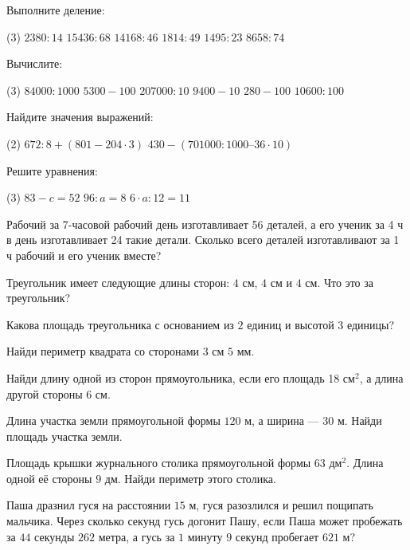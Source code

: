 \begin{class}[number=5]
	\begin{listofex}
		\item Выполните деление:
		\begin{tasks}(3)
			\task \( 2380 : 14 \)
			\task \( 15436 : 68 \)
			\task \( 14168 : 46 \)
			\task \( 1814 : 49 \)
			\task \( 1495 : 23 \)
			\task \( 8658 : 74 \)
		\end{tasks} 
		\item Вычислите: \begin{tasks}(3)
			\task \( 84 000 : 1000  \)
			\task \( 5300 - 100   \)
			\task \(	207 000 : 10   \)
			\task \(	9400 - 10   \)
			\task \(	280- 100  \)
			\task \(	10 600 : 100 \)
		\end{tasks}
		\item Найдите значения выражений: \begin{tasks}(2)
			\task \( 672 : 8 + (801 - 204 \cdot 3) \)
			\task \( 430 - (701 000 : 1000 – 36 \cdot 10) \)
		\end{tasks}
		\item Решите уравнения: 
		\begin{tasks}(3)
			\task \( 83 - c = 52 \)
			\task \( 96 : a = 8  \)
			\task \( 6\cdot a : 12 = 11  \)
		\end{tasks}      
		\item Рабочий за 7-часовой рабочий день изготавливает 56 деталей, а его ученик за 4 ч в день изготавливает 24 такие детали. Сколько всего деталей изготавливают за 1 ч рабочий и его ученик вместе?
		\item Треугольник имеет следующие длины сторон: \( 4 \) см, \( 4 \) см и \( 4 \) см. Что это за треугольник?
		\item Какова площадь треугольника с основанием из \( 2 \) единиц и высотой \( 3 \) единицы?
		\item Найди периметр квадрата со сторонами \( 3 \) см \( 5 \) мм.
		\item Найди длину одной из сторон прямоугольника, если его площадь 18 см\( ^{2} \), а длина другой стороны 6 см.
		\item Длина участка земли прямоугольной формы \( 120 \) м, а ширина --- \( 30 \) м. Найди площадь участка земли.
		\item  Площадь крышки журнального столика прямоугольной формы \( 63 \) дм\( ^{2} \). Длина одной её стороны \( 9 \) дм. Найди периметр этого столика.
		\item Паша дразнил гуся на расстоянии \( 15 \) м, гуся разозлился и решил пощипать мальчика. Через сколько секунд гусь догонит Пашу, если Паша может пробежать за \(  44  \) секунды \( 262 \) метра, а гусь за \( 1 \) минуту \( 9 \) секунд пробегает \( 621 \) м?

\end{listofex}
\end{class}
